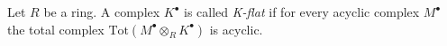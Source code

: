 \begin{definition}
\label{definition-K-flat}
Let $R$ be a ring. A complex $K^\bullet$ is called {\it K-flat}
if for every acyclic complex $M^\bullet$ the total complex
$\text{Tot}(M^\bullet \otimes_R K^\bullet)$ is acyclic.
\end{definition}